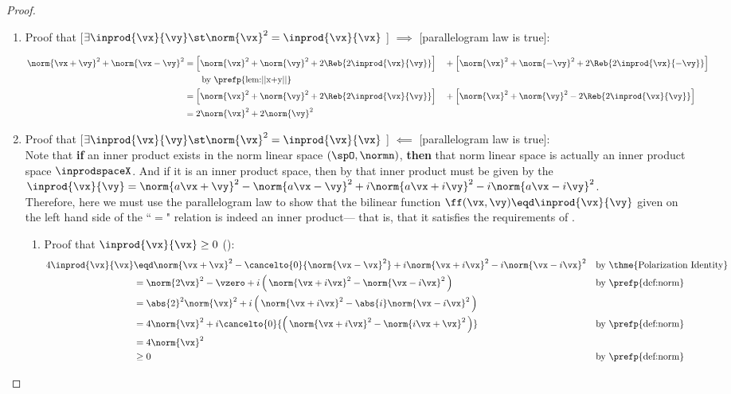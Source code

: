 \begin{proof}
\begin{enumerate}
\item Proof that
    [$\exists\inprod{\vx}{\vy}\st\norm{\vx}^2=\inprod{\vx}{\vx}$ ]
     $\implies$
    [parallelogram law is true]:

  \begin{align*}
    \norm{\vx+\vy}^2 + \norm{\vx-\vy}^2
      &=  \left[ \norm{\vx}^2 + \norm{\vy}^2 + 2\Reb{2\inprod{\vx}{\vy}}  \right]
      &&+ \left[ \norm{\vx}^2 + \norm{-\vy}^2 + 2\Reb{2\inprod{\vx}{-\vy}} \right]
      \\&\qquad\text{by \prefp{lem:||x+y||}}
    \\&=  \left[ \norm{\vx}^2 + \norm{\vy}^2 + 2\Reb{2\inprod{\vx}{\vy}}  \right]
      &&+ \left[ \norm{\vx}^2 + \norm{\vy}^2 - 2\Reb{2\inprod{\vx}{\vy}} \right]
    \\&=  2\norm{\vx}^2 + 2\norm{\vy}^2
  \end{align*}

\item Proof that
  [$\exists\inprod{\vx}{\vy}\st\norm{\vx}^2=\inprod{\vx}{\vx}$ ]
   $\impliedby$
  [parallelogram law is true]:\\
  Note that  {\bf if} an inner product exists in the norm linear
  space $(\spO,\normn )$, {\bf then} that norm linear space is actually
  an inner product space $\inprodspaceX$.
  And if it is an inner product space, then by 
  that inner product must be given by the 
  \\\indentx
  $\inprod{\vx}{\vy}=\norm{a\vx+\vy}^2 - \norm{a\vx-\vy}^2 + i\norm{a\vx+i\vy}^2 -i\norm{a\vx-i\vy}^2$.
  \\
  Therefore, here we must use the parallelogram law to show that the bilinear function
  $\ff(\vx,\vy)\eqd\inprod{\vx}{\vy}$
  given on the left hand side of the ``$=$" relation is indeed an inner product---
  that is, that it satisfies the requirements of .

  \begin{enumerate}
    \item Proof that $\inprod{\vx}{\vx} \ge 0$ ():
      \begin{align*}
        4\inprod{\vx}{\vx}
          &\eqd \norm{\vx+\vx}^2 - \cancelto{0}{\norm{\vx-\vx}^2} + i\norm{\vx+i\vx}^2 -i\norm{\vx-i\vx}^2
          &&    \text{by \thme{Polarization Identity}}
        \\&=    \norm{2\vx}^2 - \vzero + i\left(\, \norm{\vx+i\vx}^2 -\norm{\vx-i\vx}^2\,\right)
          &&    \text{by \prefp{def:norm}}
        \\&=    \abs{2}^2\norm{\vx}^2 + i\left(\, \norm{\vx+i\vx}^2 -\abs{i}\norm{\vx-i\vx}^2\,\right)
        \\&=    4\norm{\vx}^2 + i\cancelto{0}{\left(\, \norm{\vx+i\vx}^2 -\norm{i\vx+\vx}^2\,\right)}
          &&    \text{by \prefp{def:norm}}
        \\&=    4\norm{\vx}^2
        \\&\ge  0
          &&    \text{by \prefp{def:norm}}
      \end{align*}


\end{enumerate}
\end{enumerate}
\end{proof}
